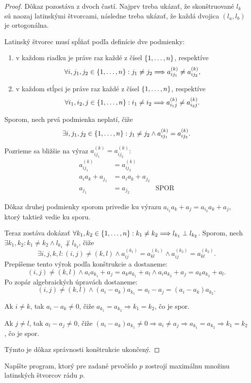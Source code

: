 \begin{proof}
Dôkaz pozostáva z dvoch častí.
Najprv treba ukázať, že skonštruované $l_k$ sú naozaj latinskými štvorcami, následne treba ukázať, že každá dvojica $(l_a, l_b)$ je ortogonálna.

Latinský štvorec musí spĺňať podľa definície dve podmienky:
\begin{enumerate}
    \item v každom riadku je práve raz každé z čísel $\left\{1, \ldots, n\right\}$, respektíve $$\forall i, j_1, j_2 \in \left\{1, \ldots, n\right\}: j_1 \neq j_2 \Longrightarrow a_{ij_1}^{(k)} \neq a_{ij_2}^{(k)},$$
    \item v každom stĺpci je práve raz každé z čísel $\left\{1, \ldots, n\right\}$, respektíve $$\forall i_1, i_2, j \in \left\{1, \ldots, n\right\}: i_1 \neq i_2 \Longrightarrow a_{i_1j}^{(k)} \neq a_{i_2j}^{(k)}.$$
\end{enumerate}

Sporom, nech prvá podmienka neplatí, čiže $$\exists i, j_1, j_2  \in \left\{1, \ldots, n\right\}: j_1 \neq j_2 \wedge a_{ij_1}^{(k)} = a_{ij_2}^{(k)}.$$

Pozrieme sa bližšie na výraz $a_{ij_1}^{(k)} = a_{ij_2}^{(k)}$:
\begin{align*}
a_{ij_1}^{(k)} &= a_{ij_2}^{(k)}\\
a_i a_{k} + a_{j_1} &= a_i a_{k} + a_{j_2}\\
a_{j_1} &= a_{j_2}&\text{SPOR}
\end{align*}

Dôkaz druhej podmienky sporom privedie ku výrazu $a_{i_1}a_k + a_j = a_{i_2}a_k + a_j$, ktorý taktiež vedie ku sporu.

Teraz zostáva dokázať $\forall k_1, k_2 \in \left\{1, \ldots, n\right\}: k_1 \neq k_2 \Longrightarrow l_{k_1} \perp l_{k_2}$.
Sporom, nech $\exists k_1, k_2: k_1 \neq k_2 \wedge l_{k_1} \not\perp l_{k_2}$, čiže $$\exists i, j, k, l: (i, j) \neq (k, l) \wedge a^{(k_1)}_{ij} = a^{(k_1)}_{kl} \wedge a^{(k_2)}_{ij} = a^{(k_2)}_{kl}.$$
Prepíšeme tento výrok podľa konštrukcie a dostaneme:
$$
(i, j) \neq (k, l) \wedge a_i a_{k_1} + a_j = a_k a_{k_1} + a_l \wedge a_i a_{k_2} + a_j = a_k a_{k_2} + a_l.
$$
Po zopár algebraických úpravách dostaneme:
$$
(i, j) \neq (k, l) \wedge (a_i - a_k) a_{k_1} = a_l - a_j = (a_i - a_k)a_{k_2}.
$$

Ak $i \neq k$, tak $a_i - a_k \neq 0$, čiže $a_{k_1} = a_{k_2} \Longrightarrow k_1 = k_2$, čo je spor.

Ak $j \neq l$, tak $a_l - a_j \neq 0$, čiže $(a_i - a_k) a_{k_1} \neq 0 \Longrightarrow a_i \neq a_j \Longrightarrow a_{k_1} = a_{k_2} \Longrightarrow k_1 = k_2$, čo je spor.

Týmto je dôkaz správnosti konštrukcie ukončený.

\end{proof}
\begin{exercise}
Napíšte program, ktorý pre zadané prvočíslo $p$ zostrojí maximálnu množinu latinských štvorcov rádu $p$.
\end{exercise}

